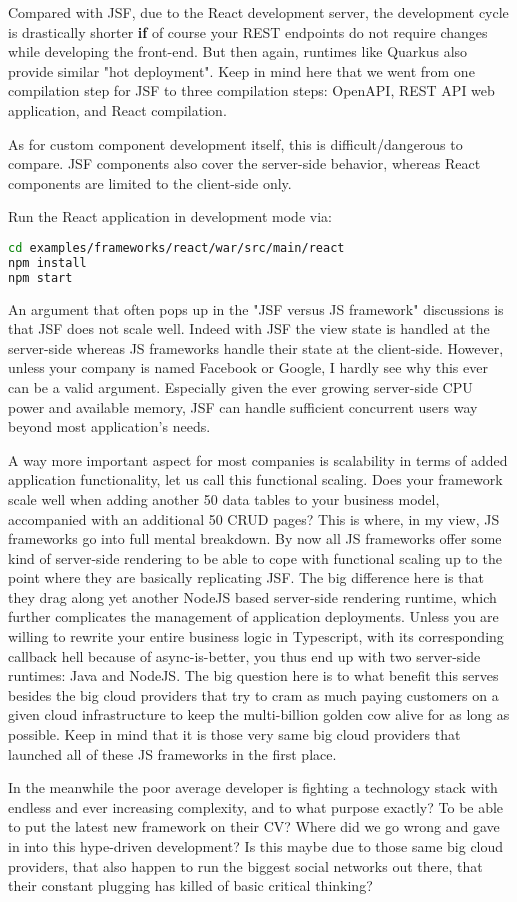 Compared with JSF, due to the React development server, the development cycle is drastically shorter \textbf{if} of course your REST endpoints do not require changes while developing the front-end.
But then again, runtimes like Quarkus also provide similar "hot deployment".
Keep in mind here that we went from one compilation step for JSF to three compilation steps: OpenAPI, REST API web application, and React compilation.

As for custom component development itself, this is difficult/dangerous to compare.
JSF components also cover the server-side behavior, whereas React components are limited to the client-side only.

Run the React application in development mode via:
\begin{lstlisting}[language=bash]
cd examples/frameworks/react/war/src/main/react
npm install
npm start
\end{lstlisting}

An argument that often pops up in the "JSF versus JS framework" discussions is that JSF does not scale well.
Indeed with JSF the view state is handled at the server-side whereas JS frameworks handle their state at the client-side.
However, unless your company is named Facebook or Google, I hardly see why this ever can be a valid argument.
Especially given the ever growing server-side CPU power and available memory, JSF can handle sufficient concurrent users way beyond most application's needs.

A way more important aspect for most companies is scalability in terms of added application functionality, let us call this functional scaling.
Does your framework scale well when adding another 50 data tables to your business model, accompanied with an additional 50 CRUD pages?
This is where, in my view, JS frameworks go into full mental breakdown.
By now all JS frameworks offer some kind of server-side rendering to be able to cope with functional scaling up to the point where they are basically replicating JSF.
The big difference here is that they drag along yet another NodeJS based server-side rendering runtime, which further complicates the management of application deployments.
Unless you are willing to rewrite your entire business logic in Typescript, with its corresponding callback hell because of async-is-better, you thus end up with two server-side runtimes: Java and NodeJS.
The big question here is to what benefit this serves besides the big cloud providers that try to cram as much paying customers on a given cloud infrastructure to keep the multi-billion golden cow alive for as long as possible.
Keep in mind that it is those very same big cloud providers that launched all of these JS frameworks in the first place.

In the meanwhile the poor average developer is fighting a technology stack with endless and ever increasing complexity, and to what purpose exactly?
To be able to put the latest new framework on their CV?
Where did we go wrong and gave in into this hype-driven development?
Is this maybe due to those same big cloud providers, that also happen to run the biggest social networks out there, that their constant plugging has killed of basic critical thinking?